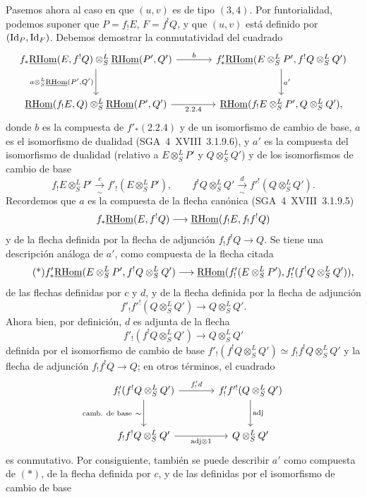 \enlargethispage{-2\baselineskip}
Pasemos ahora al caso en que $(u,v)$ es de tipo $(3,4)$. Por funtorialidad, podemos suponer que $P=f_{!}E$, $F=f^{!}Q$, y que $(u,v)$ está definido por $(\mathrm{Id}_P,\mathrm{Id}_F)$. Debemos demostrar la conmutatividad del cuadrado
\[
\begin{tikzcd}[column sep=large,row sep=large]
f_*\uRHom(E,f^!Q)\otimes^L_S\uRHom(P',Q') \arrow[r,"b"] \arrow[d,"{a\otimes^L_S\uRHom(P',Q')}"'] & f'_*\uRHom(E\otimes^L_SP',f^!Q\otimes^L_SQ') \arrow[d,"a'"]\\
\uRHom(f_!E,Q)\otimes^L_S\uRHom(P',Q') \arrow[r,"2.2.4"'] & \uRHom(f_!E\otimes^L_SP',Q\otimes^L_SQ'),
\end{tikzcd}
\]
donde $b$ es la compuesta de $f'_*(2.2.4)$ y de un isomorfismo de cambio de base, $a$ es el isomorfismo de dualidad (SGA~4~XVIII~3.1.9.6), y $a'$ es la compuesta del isomorfismo de dualidad (relativo a $E\otimes^L_SP'$ y $Q\otimes^L_SQ'$) y de los isomorfismos de cambio de base
\[
f_!E\otimes^L_SP'\xrightarrow[\sim]{c}f'_!(E\otimes^L_SP'),
\qquad
f^!Q\otimes^L_SQ'\xrightarrow[\sim]{d}f'^!(Q\otimes^L_SQ').
\]
Recordemos que $a$ es la compuesta de la flecha canónica (SGA~4~XVIII~3.1.9.5)
\[
f_*\underline{\mathrm{RHom}}(E,f^!Q)\longrightarrow\underline{\mathrm{RHom}}(f_!E,f_!f^!Q)
\]
y de la flecha definida por la flecha de adjunción $f_!f^!Q\to Q$. Se tiene una descripción análoga de $a'$, como compuesta de la flecha citada
\begin{equation}\tag{*}
f'_*\underline{\mathrm{RHom}}(E\otimes^L_SP',f^!Q\otimes^L_SQ')\longrightarrow
\underline{\mathrm{RHom}}(f'_!(E\otimes^L_SP'),f'_!(f^!Q\otimes^L_SQ')),
\end{equation}
de las flechas definidas por $c$ y $d$, y de la flecha definida por la flecha de adjunción
\[
f'_!f'^!(Q\otimes^L_SQ')\longrightarrow Q\otimes^L_SQ'.
\]
Ahora bien, por definición, $d$ es adjunta de la flecha
\[
f'_!(f^!Q\otimes^L_SQ')\longrightarrow Q\otimes^L_SQ'
\]
definida por el isomorfismo de cambio de base $f'_!(f^!Q\otimes^L_SQ')\simeq f_!f^!Q\otimes^L_SQ'$ y la flecha de adjunción $f_!f^!Q\to Q$; en otros términos, el cuadrado
\[
\begin{tikzcd}[column sep=large,row sep=large]
f'_!(f^!Q\otimes^L_SQ') \arrow[r,"{f'_!d}"] \arrow[d,"{\text{camb. de base}\ \sim}"'] & f'_!f'^!(Q\otimes^L_SQ') \arrow[d,"\mathrm{adj}"]\\
f_!f^!Q\otimes^L_SQ' \arrow[r,"{\mathrm{adj}\otimes 1}"'] & Q\otimes^L_SQ'
\end{tikzcd}
\]
es conmutativo. Por consiguiente, también se puede describir $a'$ como compuesta de $(*)$, de la flecha definida por $c$, y de las definidas por el isomorfismo de cambio de base
